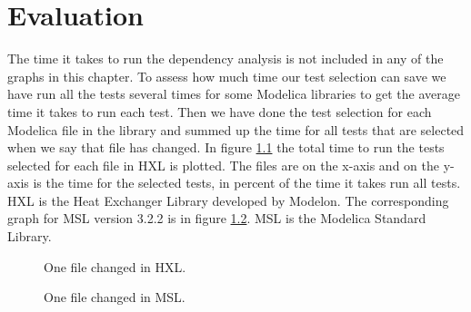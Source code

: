 \documentclass{cslthse-msc}
\begin{document}
\chapter[Evaluation]{Evaluation}
The time it takes to run the dependency analysis is not included in any of the graphs in this chapter.
To assess how much time our test selection can save we have run all the tests several times for some Modelica libraries to get the average time it takes to run each test. Then we have done the test selection for each Modelica file in the library and summed up the time for all tests that are selected when we say that file has changed. In figure \ref{fig:hxlonefile} the total time to run the tests selected for each file in HXL is plotted. The files are on the x-axis and on the y-axis is the time for the selected tests, in percent of the time it takes run all tests. HXL is the Heat Exchanger Library developed by Modelon. The corresponding graph for MSL version 3.2.2 is in figure \ref{fig:mslonefile}. MSL is the Modelica Standard Library.

\begin{figure}
    \centering
    \caption{One file changed in HXL.}
    \label{fig:hxlonefile}
\end{figure}

\begin{figure}
    \centering
    \caption{One file changed in MSL.}
    \label{fig:mslonefile}
\end{figure}
\end{document}
